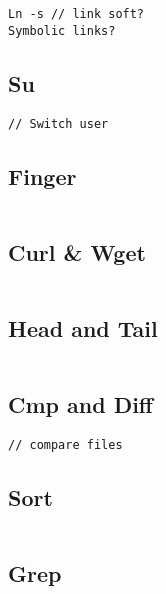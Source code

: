 \begin{verbatim}
Ln -s // link soft?
Symbolic links?
\end{verbatim}

\subsection{Su}
\begin{verbatim}
// Switch user
\end{verbatim}

\subsection{Finger}

\begin{verbatim}
\end{verbatim}

\subsection{Curl & Wget}

\begin{verbatim}
\end{verbatim}

\subsection{Head and Tail}
\begin{verbatim}
\end{verbatim}

\subsection{Cmp and Diff}

\begin{verbatim}
// compare files
\end{verbatim}

\subsection{Sort}

\begin{verbatim}
\end{verbatim}

\subsection{Grep}

